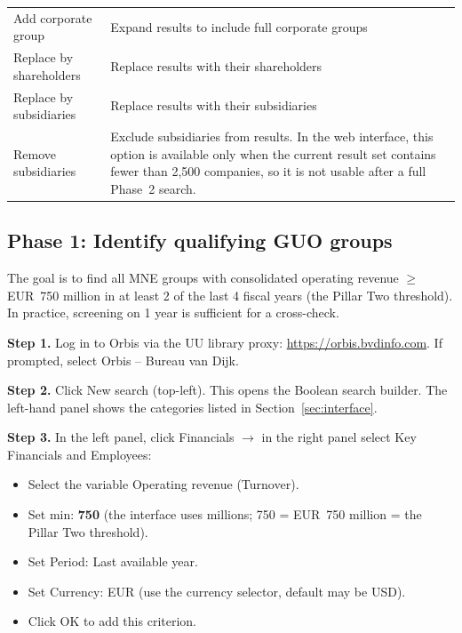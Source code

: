 \documentclass[11pt,a4paper]{article}
\newcommand{\menu}[1]{\textsf{#1}}
\newcommand{\step}[1]{\noindent\textbf{Step #1.}\quad}
\begin{document}
\begin{table}[H]
\begin{tabular}{@{}L{5cm}L{9cm}@{}}
Add corporate group & Expand results to include full corporate groups \\
Replace by shareholders & Replace results with their shareholders \\
Replace by subsidiaries & Replace results with their subsidiaries \\
Remove subsidiaries & Exclude subsidiaries from results. In the web interface, this option is available only when the current result set contains fewer than 2,500 companies, so it is not usable after a full Phase~2 search. \\
\bottomrule
\end{tabular}
\end{table}


\subsection{Phase 1: Identify qualifying GUO groups}\label{sec:phase1}

The goal is to find all MNE groups with consolidated operating revenue $\geq$ EUR~750 million in at least 2 of the last 4 fiscal years (the Pillar Two threshold). In practice, screening on 1 year is sufficient for a cross-check.

\step{1} Log in to Orbis via the UU library proxy: \url{https://orbis.bvdinfo.com}. If prompted, select \menu{Orbis -- Bureau van Dijk}.

\step{2} Click \menu{New search} (top-left). This opens the Boolean search builder. The left-hand panel shows the categories listed in Section~\ref{sec:interface}.

\step{3} In the left panel, click \menu{Financials} $\to$ in the right panel select \menu{Key Financials and Employees}:
\begin{itemize}[noitemsep]
  \item Select the variable \menu{Operating revenue (Turnover)}.
  \item Set \menu{min}: \textbf{750} (the interface uses millions; 750 = EUR~750 million = the Pillar Two threshold).
  \item Set \menu{Period}: Last available year.
  \item Set \menu{Currency}: EUR (use the currency selector, default may be USD).
  \item Click \menu{OK} to add this criterion.
\end{itemize}
\end{document}
